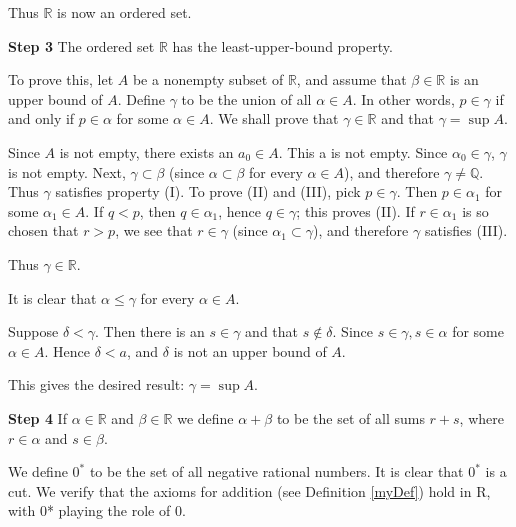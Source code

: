 Thus $\mathbb{R}$ is now an ordered set.


\textbf{Step 3}
The ordered set $\mathbb{R}$ has the least-upper-bound property.

To prove this, let $A$ be a nonempty subset of $\mathbb{R}$, and assume that $\beta \in \mathbb{R}$ is an upper bound of $A$. Define $\gamma$ to be the union of all $\alpha \in A$. In other words, $p\in \gamma$ if and only if $p \in \alpha$ for some $\alpha \in A$. We shall prove that $\gamma \in \mathbb{R}$ and that $\gamma = \sup A$.

Since $A$ is not empty, there exists an $a_0 \in A$. This a is not empty. Since $\alpha_0 \in \gamma$, $\gamma$ is not empty. Next, $\gamma \subset \beta$ (since $\alpha \subset \beta$ for every $\alpha \in A$), and therefore $\gamma \neq \mathbb{Q}$. Thus $\gamma$ satisfies property (I). To prove (II) and (III), pick $p \in \gamma$. Then $p \in \alpha_1$ for some $\alpha_1 \in A$. If $q <p$, then $q \in \alpha_1$, hence $q \in \gamma$; this proves (II). If $r \in \alpha_1$ is so chosen that $r > p$, we see that $r\in \gamma$ (since $\alpha_1 \subset \gamma$), and therefore $\gamma$
satisfies (III).

Thus $\gamma \in \mathbb{R}$.

It is clear that $\alpha \leq \gamma$ for every $\alpha \in A$.

Suppose $\delta < \gamma$. Then there is an $s \in \gamma$ and that $s \not\in \delta$. Since $s \in \gamma, s \in \alpha$
for some $\alpha \in A$. Hence $\delta <a$, and $\delta$ is not an upper bound of $A$.

This gives the desired result: $\gamma = \sup A$.


\textbf{Step 4} If $\alpha \in \mathbb{R}$ and $\beta \in \mathbb{R}$ we define $\alpha + \beta$ to be the set of all sums $r + s$, where
$r \in \alpha$ and $s \in \beta$.

We define $0^*$ to be the set of all negative rational numbers. It is clear that $0^*$ is a cut. We verify that the axioms for addition (see Definition \ref{myDef}) hold in
R, with 0* playing the role of 0.